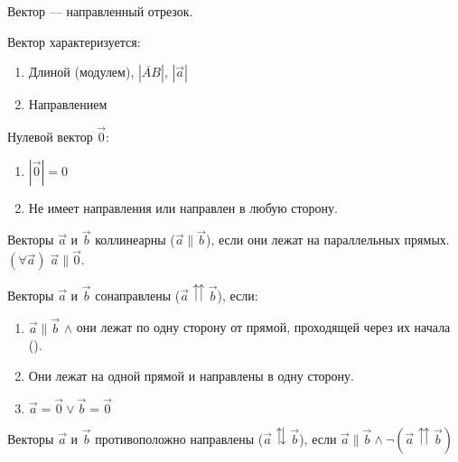\documentclass{article}
\begin{document}


Вектор --- направленный отрезок.

Вектор характеризуется:
\begin{enumerate}
	\item{}Длиной (модулем), $|\lvec{AB}|$, $|\vec{a}|$
	\item{}Направлением
\end{enumerate}

Нулевой вектор $\vec{0}$:
\begin{enumerate}
	\item{}$|\vec{0}|=0$
	\item{}Не имеет направления или направлен в любую сторону.
\end{enumerate}


Векторы $\vec{a}$ и $\vec{b}$ коллинеарны ($\vec{a}\parallel\vec{b}$), если они лежат на параллельных прямых. $(\forall \vec{a})\;\vec{a}\parallel\vec{0}$.


\begin{minipage}{0.6\linewidth}
	Векторы $\vec{a}$ и $\vec{b}$ сонаправлены ($\vec{a}\upuparrows\vec{b}$), если:
	\begin{enumerate}
		\item{}$\vec{a}\parallel\vec{b}$ $\land$ они лежат по одну сторону от прямой, проходящей через их начала ().
		\item{}Они лежат на одной прямой и направлены в одну сторону.
		\item{}$\vec{a}=\vec{0}\lor\vec{b}=\vec{0}$
	\end{enumerate}

	Векторы $\vec{a}$ и $\vec{b}$ противоположно направлены ($\vec{a}\updownarrows\vec{b}$), если $\vec{a}\parallel\vec{b}\land\lnot(\vec{a}\upuparrows\vec{b})$

\end{minipage}%
\begin{minipage}{0.4\linewidth}
	\centering
	\label{1:codirectional}
\end{minipage}
\end{document}
